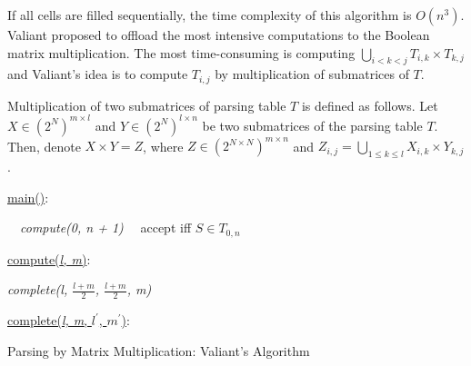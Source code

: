 If all cells are filled sequentially, the time complexity of this algorithm is $O(n^3)$.
Valiant proposed to offload the most intensive computations to the Boolean matrix multiplication. 
The most time-consuming is computing $\bigcup\limits_{i < k < j} T_{i, k} \times T_{k, j}$ and Valiant's idea is to compute $T_{i, j}$ by multiplication of submatrices of $T$.

Multiplication of two submatrices of parsing table $T$ is defined as follows.
Let $X \in (2^N)^{m \times l}$ and $Y \in (2^N)^{l \times n}$ be two submatrices of the parsing table $T$. 
Then, denote $X \times Y = Z$, where $Z \in (2^{N \times N})^{m \times n}$ and $Z_{i, j} = \bigcup\limits_{ 1 \leq k \leq l} X_{i, k} \times Y_{k, j}$.



\begin{algorithm}[h]
\SetAlgoNoLine
{}
\underline{main()}{:}{
  
  \ \ \textit{compute(0, n + 1)\;}
  \ \ accept iff $S \in T_{0, n}$
 }

\underline{compute(\textit{l, m})}{:}{

 \textit{complete(l, $\frac{l+m}{2}$, $\frac{l+m}{2}$, m)}
 }

\underline{complete(\textit{l, m}, $l^\prime$, $m^\prime$)}{:}{

 }
\caption{Parsing by Matrix Multiplication: Valiant's Algorithm}
\label{algo:valiant}
\end{algorithm}



